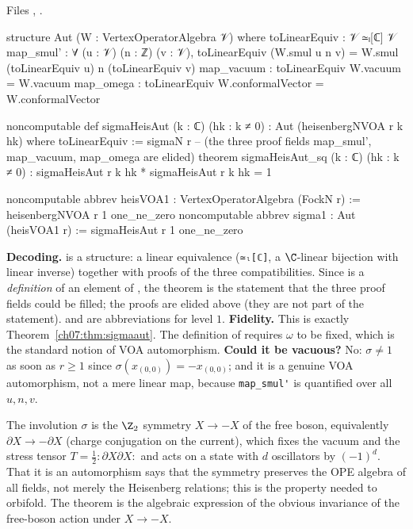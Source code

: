 \noindent Files , .
\begin{leancode}
structure Aut (W : VertexOperatorAlgebra 𝒱) where
  toLinearEquiv : 𝒱 ≃ₗ[ℂ] 𝒱
  map_smul' : ∀ (u : 𝒱) (n : ℤ) (v : 𝒱),
    toLinearEquiv (W.smul u n v) = W.smul (toLinearEquiv u) n (toLinearEquiv v)
  map_vacuum : toLinearEquiv W.vacuum = W.vacuum
  map_omega : toLinearEquiv W.conformalVector = W.conformalVector

noncomputable def sigmaHeisAut (k : ℂ) (hk : k ≠ 0) : Aut (heisenbergNVOA r k hk) where
  toLinearEquiv := sigmaN r
  -- (the three proof fields map_smul', map_vacuum, map_omega are elided)
theorem sigmaHeisAut_sq (k : ℂ) (hk : k ≠ 0) : sigmaHeisAut r k hk * sigmaHeisAut r k hk = 1

noncomputable abbrev heisVOA1 : VertexOperatorAlgebra (FockN r) :=
  heisenbergNVOA r 1 one_ne_zero
noncomputable abbrev sigma1 : Aut (heisVOA1 r) := sigmaHeisAut r 1 one_ne_zero
\end{leancode}

\begin{dictionary}
\textbf{Decoding.}  is a structure: a linear equivalence (\verb|≃ₗ[ℂ]|, a
$\C$-linear bijection with linear inverse) together with proofs of the three compatibilities.
Since  is a \emph{definition} of an element of , the theorem is the
statement that the three proof fields could be filled; the proofs are elided above (they are
not part of the statement).  and  are abbreviations for level
$1$. \textbf{Fidelity.} This is exactly Theorem~\ref{ch07:thm:sigmaaut}. The definition of
 requires $\omega$ to be fixed, which is the standard notion of VOA automorphism.
\textbf{Could it be vacuous?} No: $\sigma\ne1$ as soon as $r\ge1$ since $\sigma(x_{(0,0)}) =
-x_{(0,0)}$; and it is a genuine VOA automorphism, not a mere linear map, because
\verb|map_smul'| is quantified over all $u,n,v$.
\end{dictionary}

\begin{physics}
The involution $\sigma$ is the $\Z_2$ symmetry $X\to-X$ of the free boson, equivalently $\partial X\to-\partial X$ (charge conjugation on the current), which fixes the vacuum and the stress tensor $T=\tfrac12{:}\partial X\partial X{:}$ and acts on a state with $d$ oscillators by $(-1)^d$. That it is an automorphism says that the symmetry preserves the OPE algebra of all fields, not merely the Heisenberg relations; this is the property needed to orbifold. The theorem is the algebraic expression of the obvious invariance of the free-boson action under $X\to-X$.
\end{physics}

